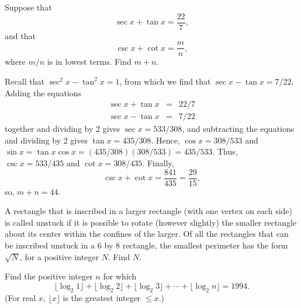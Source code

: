 \begin{question}[name={1991 AIME, \href{https://artofproblemsolving.com/community/c4p43833}{Problem 9}}]
	Suppose that $$\sec x+\tan x=\frac{22}7,$$ and that $$\csc x+\cot x=\frac mn,$$ where $m/n$ is in lowest terms. Find $m+n.$	
\end{question}


\begin{solution}[name={Solution by chess64}]
	Recall that $\sec^2 x - \tan^2 x = 1$, from which we find that $\sec x - \tan x = 7/22$. Adding the equations\begin{eqnarray*} \sec x + \tan x &=& 22/7\\\sec x- \tan x &=& 7/22\end{eqnarray*}together and dividing by 2 gives $\sec x = 533/308$, and subtracting the equations and dividing by 2 gives $\tan x = 435/308$. Hence, $\cos x = 308/533$ and $\sin x=\tan x \cos x = (435/308)(308/533)=435/533$. Thus, $\csc x = 533/435$ and $\cot x = 308/435$. Finally,\[ \csc x + \cot x = \frac{841}{435}=\frac{29}{15}, \]so, $m+n=\boxed {44}$.
\end{solution}




\begin{question}[name={1993 AIME, \href{https://artofproblemsolving.com/community/c4p424589}{Problem 14}}]
	A rectangle that is inscribed in a larger rectangle (with one vertex on each side) is called unstuck if it is possible to rotate (however slightly) the smaller rectangle about its center within the confines of the larger. Of all the rectangles that can be inscribed unstuck in a 6 by 8 rectangle, the smallest perimeter has the form $\sqrt{N}$, for a positive integer $N$. Find $N$.
\end{question}







\begin{question}[name={1994 AIME, \href{https://artofproblemsolving.com/community/c4p73948}{Problem 4}}]
	Find the positive integer $n$ for which\[ \lfloor \log_2{1}\rfloor+\lfloor\log_2{2}\rfloor+\lfloor\log_2{3}\rfloor+\cdots+\lfloor\log_2{n}\rfloor=1994.  \](For real $x$, $\lfloor x\rfloor$ is the greatest integer $\le x.$)
\end{question}


%	













